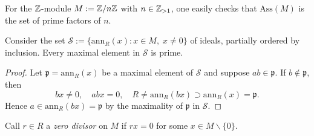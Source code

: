 \begin{example}
	For the $\mathbb{Z}$-module $M := \mathbb{Z}/n\mathbb{Z}$ with $n \in \mathbb{Z}_{> 1}$, one easily checks that $\text{Ass}(M)$ is the set of prime factors of $n$.
\end{example}

\begin{lemma}\label{prop:Ass-maximal}
	Consider the set $\mathcal{S} := \{ \mathrm{ann}_R(x) : x \in M, \; x \neq 0 \}$ of ideals, partially ordered by inclusion. Every maximal element in $\mathcal{S}$ is prime.
\end{lemma}
\begin{proof}
	Let $\mathfrak{p} = \text{ann}_R(x)$ be a maximal element of $\mathcal{S}$ and suppose $ab \in \mathfrak{p}$. If $b \notin \mathfrak{p}$, then
	\[ bx \neq 0, \quad abx = 0, \quad R \neq \text{ann}_R(bx) \supset \text{ann}_R(x) = \mathfrak{p}. \]
	Hence $a \in \text{ann}_R(bx) = \mathfrak{p}$ by the maximality of $\mathfrak{p}$ in $\mathcal{S}$.
\end{proof}

\begin{definition}
	Call $r \in R$ a \emph{zero divisor} on $M$ if $rx=0$ for some $x \in M \smallsetminus \{0\}$.
\end{definition}

